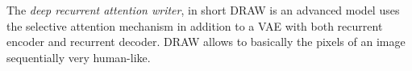 The \emph{deep recurrent attention writer}, in short DRAW is an advanced model uses the selective attention mechanism in addition to a VAE with both recurrent encoder and recurrent decoder.
DRAW allows to basically the pixels of an image sequentially very human-like.
